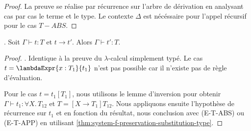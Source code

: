 \begin{proof}
  \label{proof:system-f-preservation-substitution-type}
  La preuve se réalise par récurrence sur l'arbre de dérivation en analysant
  cas par cas le terme et le type. Le contexte $\Delta$ est nécéssaire pour
  l'appel récursif pour le cas $T-ABS$.
\end{proof}

\begin{theorem} 
  \label{thm:system-f-preservation}.
  Soit $\Gamma \vdash t : T$ et $t \rightarrow t'$. Alors $\Gamma \vdash t' :
  T$.
\end{theorem}

\begin{proof}
  \label{thm:system-f-preservation-proof}.
  Identique à la preuve du $\lambda$-calcul simplement typé. Le cas $t =
  \lambdaExpr{x : T_{1}}{t_{1}}$ n'est pas possible car il n'existe pas de règle
  d'évaluation.

  Pour le cas $t = t_{1}[T_{1}]$, nous utilisons le lemme d'inversion pour
  obtenir $\Gamma \vdash t_{1} : \forall X . \, T_{12}$ et $T = [X \rightarrow
  T_{1}] T_{12}$. Nous appliquons ensuite l'hypothèse de récurrence sur $t_{1}$
  et en fonction du résultat, nous conclusion avec (E-T-ABS) ou (E-T-APP) en
  utilisant \ref{thm:system-f-preservation-substitution-type}.
\end{proof}

